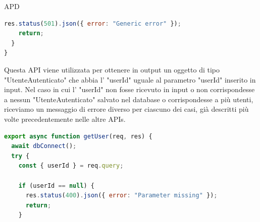 \begin{listaPersonale} {APD}
\begin{listaPersonale2}[APD]{}
\begin{lstlisting}[language=JavaScript]
    res.status(501).json({ error: "Generic error" });
    return;
  }
}
                \end{lstlisting}
                \newpage
                Questa API viene utilizzata per ottenere in output un oggetto di tipo "UtenteAutenticato" che abbia l' "userId" uguale al parametro "userId" inserito in input. Nel caso in cui l' "userId" non fosse ricevuto in input o non corrispondesse a nessun "UtenteAutenticato" salvato nel database o corrispondesse a più utenti, riceviamo un messaggio di errore diverso per ciascuno dei casi, già descritti più volte precedentemente nelle altre APIs.

                \begin{lstlisting}[language=JavaScript]
export async function getUser(req, res) {
  await dbConnect();
  try {
    const { userId } = req.query;

    if (userId == null) {
      res.status(400).json({ error: "Parameter missing" });
      return;
    }


\end{lstlisting}
\end{listaPersonale2}
\end{listaPersonale}
